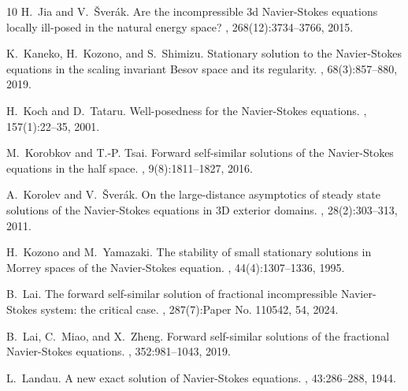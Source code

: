 \documentclass[12pt]{amsart}
\numberwithin{equation}{section}              %
\theoremstyle{remark}
\begin{document}
\begin{thebibliography}{10}
      	H.~Jia and V.~\v{S}ver\'{a}k.
      	\newblock Are the incompressible 3d {N}avier-{S}tokes equations locally
      	ill-posed in the natural energy space?
      	, 268(12):3734--3766, 2015.
      	
      	K.~Kaneko, H.~Kozono, and S.~Shimizu.
      	\newblock Stationary solution to the {N}avier-{S}tokes equations in the scaling
      	invariant {B}esov space and its regularity.
      	, 68(3):857--880, 2019.
      	
      	H.~Koch and D.~Tataru.
      	\newblock Well-posedness for the {N}avier-{S}tokes equations.
      	, 157(1):22--35, 2001.
      	
      	M.~Korobkov and T.-P. Tsai.
      	\newblock Forward self-similar solutions of the {N}avier-{S}tokes equations in
      	the half space.
      	, 9(8):1811--1827, 2016.
      	
      	A.~Korolev and V.~\v{S}ver\'{a}k.
      	\newblock On the large-distance asymptotics of steady state solutions of the
      	{N}avier-{S}tokes equations in 3{D} exterior domains.
      	,
      	28(2):303--313, 2011.
      	
      	H.~Kozono and M.~Yamazaki.
      	\newblock The stability of small stationary solutions in {M}orrey spaces of the
      	{N}avier-{S}tokes equation.
      	, 44(4):1307--1336, 1995.
      	
      	B.~Lai.
      	\newblock The forward self-similar solution of fractional incompressible
      	{N}avier-{S}tokes system: the critical case.
      	, 287(7):Paper No. 110542, 54, 2024.
      	
      	B.~Lai, C.~Miao, and X.~Zheng.
      	\newblock Forward self-similar solutions of the fractional {N}avier-{S}tokes
      	equations.
      	, 352:981--1043, 2019.
      	
      	L.~Landau.
      	\newblock A new exact solution of {N}avier-{S}tokes equations.
      	, 43:286--288, 1944.
      	

\end{thebibliography}
\end{document}
